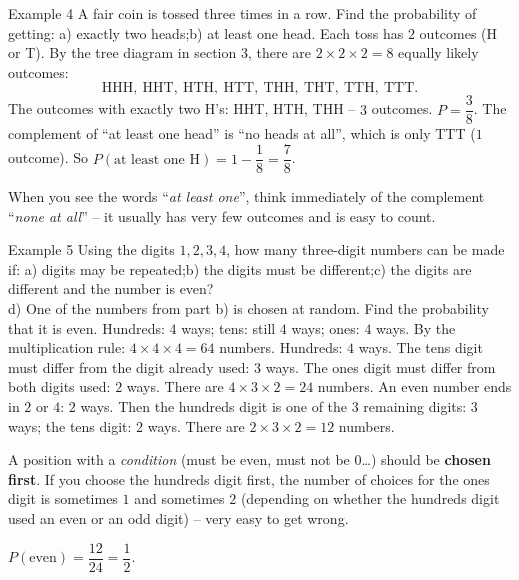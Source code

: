 \begin{exbox}{Example 4}
A fair coin is tossed three times in a row. Find the probability of getting:
a) exactly two heads;\quad b) at least one head.
\guide
{}
Each toss has $2$ outcomes (H or T). By the tree diagram in section 3, there are $2\times2\times2=8$ equally likely outcomes:
\[
\text{HHH},\ \text{HHT},\ \text{HTH},\ \text{HTT},\ \text{THH},\ \text{THT},\ \text{TTH},\ \text{TTT}.
\]
The outcomes with exactly two H's: HHT, HTH, THH -- $3$ outcomes. $P=\dfrac38$.
The complement of ``at least one head'' is ``no heads at all'', which is only TTT ($1$ outcome). So
$P(\text{at least one H})=1-\dfrac18=\dfrac78$.
\begin{tipbox}When you see the words ``\emph{at least one}'', think immediately of the complement ``\emph{none at all}'' -- it usually has very few outcomes and is easy to count.\end{tipbox}
\end{exbox}

\begin{exbox}{Example 5}
Using the digits $1,2,3,4$, how many three-digit numbers can be made if:
a) digits may be repeated;\quad b) the digits must be different;\quad c) the digits are different and the number is even?\\
d) One of the numbers from part b) is chosen at random. Find the probability that it is even.
\guide
{}
Hundreds: $4$ ways; tens: still $4$ ways; ones: $4$ ways. By the multiplication rule: $4\times4\times4=64$ numbers.
Hundreds: $4$ ways. The tens digit must differ from the digit already used: $3$ ways. The ones digit must differ from both digits used: $2$ ways. There are $4\times3\times2=24$ numbers.
An even number ends in $2$ or $4$: $2$ ways. Then the hundreds digit is one of the $3$ remaining digits: $3$ ways; the tens digit: $2$ ways. There are $2\times3\times2=12$ numbers.
\begin{tipbox}A position with a \emph{condition} (must be even, must not be $0$\ldots) should be \textbf{chosen first}. If you choose the hundreds digit first, the number of choices for the ones digit is sometimes $1$ and sometimes $2$ (depending on whether the hundreds digit used an even or an odd digit) -- very easy to get wrong.\end{tipbox}
$P(\text{even})=\dfrac{12}{24}=\dfrac12$.
\end{exbox}

